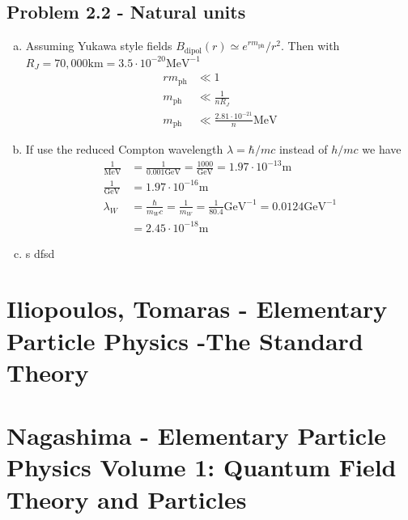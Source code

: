 \documentclass[10pt,a4paper]{book}
\theoremstyle{definition}
\begin{document}
\subsection{Problem 2.2 - Natural units}
\begin{enumerate}[(a)]
\item Assuming Yukawa style fields $B_\text{dipol}(r)\simeq e^{rm_\text{ph}}/r^2$. Then with 
$R_J=70,000\text{km}=3.5\cdot10^{-20}\text{MeV}^{-1}$
\begin{align}
rm_\text{ph}&\ll  1\\
m_\text{ph}&\ll \frac{1}{nR_J}\\
m_\text{ph}&\ll \frac{2.81\cdot 10^{-21}}{n}\text{MeV}
\end{align}

\item If use the reduced Compton wavelength $\lambda=\hbar/mc$ instead of $h/mc$ we have 
\begin{align}
\frac{1}{\text{MeV}}&=\frac{1}{0.001\text{GeV}}=\frac{1000}{\text{GeV}}=1.97\cdot 10^{-13}\text{m}\\
\frac{1}{\text{GeV}}&=1.97\cdot 10^{-16}\text{m}\\
\lambda_W&=\frac{\hbar}{m_Wc}=\frac{1}{m_W}=\frac{1}{80.4}\text{GeV}^{-1}=0.0124\text{GeV}^{-1}\\
&=2.45\cdot10^{-18}\text{m}
\end{align}
\item s dfsd
\end{enumerate}



\section{{\sc Iliopoulos, Tomaras} - Elementary Particle Physics -The Standard Theory}

\section{{\sc Nagashima} - Elementary Particle Physics Volume 1: Quantum Field Theory and Particles}
\end{document}
